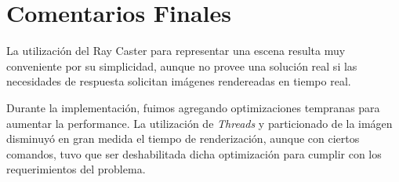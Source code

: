 \documentclass[a4paper,10pt]{article}
\begin{document}
\section{Comentarios Finales}

La utilizaci\'on del Ray Caster para representar una escena resulta muy conveniente por su simplicidad, aunque no provee una soluci\'on real
si las necesidades de respuesta solicitan im\'agenes rendereadas en tiempo real.

Durante la implementaci\'on, fuimos agregando optimizaciones tempranas para aumentar la performance. La utilizaci\'on de \emph{Threads} y
particionado de la im\'agen disminuy\'o en gran medida el tiempo de renderizaci\'on, aunque con ciertos comandos, tuvo que ser deshabilitada dicha
optimizaci\'on para cumplir con los requerimientos del problema.
\end{document}
